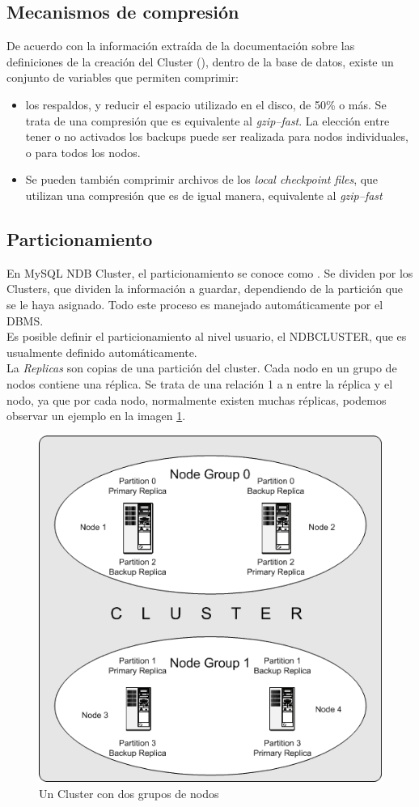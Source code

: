 \documentclass{acmart}
\begin{document}
\subsection{Mecanismos de compresión}
De acuerdo con la información extraída de la documentación sobre las definiciones de la creación del Cluster (\cite{mysqlcomp}), dentro de la base de datos, existe un conjunto de variables que permiten comprimir:
\begin{itemize}
    \item los respaldos, y reducir el espacio utilizado en el disco, de 50\% o más. Se trata de una compresión que es equivalente al \textit{gzip--fast}. La elección entre tener o no activados los backups puede ser realizada para nodos individuales, o para todos los nodos.
    \item Se pueden también comprimir archivos de los \textit{local checkpoint files}, que utilizan una compresión que es de igual manera, equivalente al \textit{gzip--fast}
\end{itemize}


\subsection{Particionamiento}
En MySQL NDB Cluster, el particionamiento se conoce como . Se dividen por los Clusters, que dividen la información a guardar, dependiendo de la partición que se le haya asignado. Todo este proceso es manejado automáticamente por el DBMS.\\
Es posible definir el particionamiento al nivel usuario, el NDBCLUSTER, que es usualmente definido automáticamente.\\
La \textit{Replicas} son copias de una partición del cluster. Cada nodo en un grupo de nodos contiene una réplica. Se trata de una relación 1 a n entre la réplica y el nodo, ya que por cada nodo, normalmente existen muchas réplicas, podemos observar un ejemplo en la imagen \ref{dosnodos}.

\begin{figure}
    \centering
    \includegraphics[width=0.4\linewidth]{replicas.png}
    \caption{Un Cluster con dos grupos de nodos}
    \label{dosnodos}
\end{figure}
\end{document}
